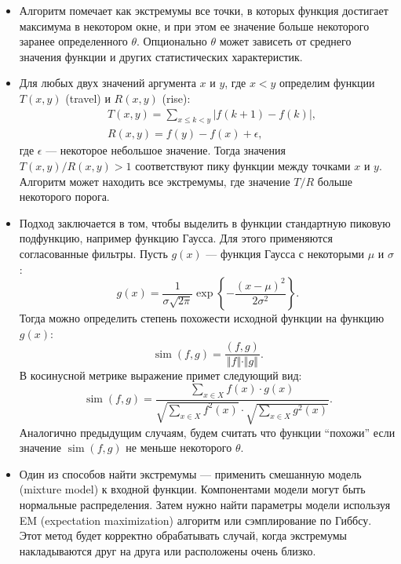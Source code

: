 \documentclass[12pt, a4paper]{article}
\DeclareMathOperator{\simu}{sim}
\begin{document}
  \begin{itemize}
	\item  
	Алгоритм помечает как экстремумы все точки, в которых функция достигает максимума в некотором окне, и при этом ее значение больше некоторого заранее определенного $\theta$. Опционально $\theta$ может зависеть от среднего значения функции и других статистических характеристик.
	
	\item
  	Для любых двух значений аргумента $x$ и $y$, где $x < y$ определим функции $T(x,y)$ (travel) и $R(x,y)$ (rise):
  	\begin{equation}
  	\begin{aligned}
	  	& T(x, y) = \sum_{x \leq k < y} \left\vert f(k + 1) - f(k) \right\vert, \\
	  	& R(x, y) = f(y) - f(x) + \epsilon,
	\end{aligned}
  	\end{equation}
  	где $\epsilon$ --- некоторое небольшое значение. Тогда значения $T(x, y)/R(x, y)>1$ соответствуют пику функции между точками $x$ и $y$. Алгоритм может находить все экстремумы, где значение $T/R$ больше некоторого порога.
  	
  	\item
  	Подход заключается в том, чтобы выделить в функции стандартную пиковую подфункцию, например функцию Гаусса. Для этого применяются согласованные фильтры. Пусть $g(x)$ --- функция Гаусса с некоторыми $\mu$ и $\sigma$:
\begin{equation}
  	g(x) = \frac{1}{\sigma \sqrt{2\pi}} \exp\left\{ -\frac{(x-\mu)^2}{2 \sigma^2} \right\}.
  	\end{equation}  	
  	Тогда можно определить степень похожести исходной функции на функцию $g(x)$:
  	\begin{equation}
  	\simu(f,g) = \frac{\left(f,g\right)}{\Vert f \Vert \cdot \Vert g \Vert}.
  	\end{equation}
  	В косинусной метрике выражение примет следующий вид:
  	\begin{equation}
  	\simu(f,g) = \frac{\sum\limits_{x \in X} f(x) \cdot g(x)}{\sqrt{\sum\limits_{x \in X}^{\,} f^2(x)} \cdot \sqrt{\sum\limits_{x \in X}^{\,} g^2(x)}}.
  	\end{equation}
  	Аналогично предыдущим случаям, будем считать что функции ``похожи'' если значение $\simu(f,g)$ не меньше некоторого $\theta$.
  	
  	\item
	Один из способов найти экстремумы --- применить смешанную модель (mixture model) к входной функции. Компонентами модели могут быть нормальные распределения. Затем нужно найти параметры модели используя EM (expectation maximization) алгоритм или сэмплирование по Гиббсу. Этот метод будет корректно обрабатывать случай, когда экстремумы накладываются друг на друга или расположены очень близко.
  \end{itemize}
  
\end{document}
